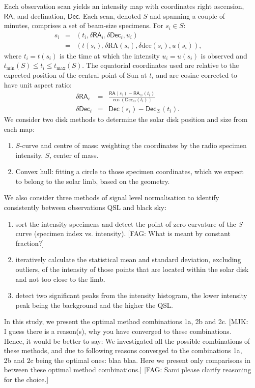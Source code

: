 \documentclass{aa}
\newcommand{\fag}[1]{\textcolor{midpurple}{[FAG: #1]}} %
\newcommand{\mjk}[1]{\textcolor{midgreen}{[MJK: #1]}} %
\newcommand{\eqnl}[2]{\begin{eqnarray}\label{#1}#2\end{eqnarray}}
\newcommand{\s}[2]{{#1}_{\mathrm{#2}}}
\newcommand{\RA}{{\mathsf{RA}}}
\newcommand{\Dec}{{\mathsf{Dec}}}
\newcommand{\dR}{{\mathsf{\delta RA}}}
\newcommand{\dD}{{\mathsf{\delta Dec}}}
\begin{document}
  Each observation scan yields an intensity map with coordinates right 
  ascension, $\RA$, and declination, $\Dec$.
  Each scan, denoted $S$ and spanning a couple of minutes, comprises a set of beam-size specimens. For $s_i \in S$:
  \eqnl{radio_sample}{
  s_i &=& 
  \left( t_i, \dR_i, \dD_i, u_i \right) \\ %
  &=& \left( t(s_i),\delta \mathrm{RA}(s_i), \delta \mathrm{dec}(s_i), u(s_i) \right) \text{,}
  }
  where $t_i=t(s_i)$ is the time at which the intensity $u_i=u(s_i)$ is
  observed and 
  $\s{t}{min}(S) \le t_i \le \s{t}{max}(S)$.
  The equatorial coordinates used are relative to the expected position of
  the central point of Sun at $t_i$ and are cosine corrected to have unit
  aspect ratio:
  \eqnl{relative_radec}{
  \dR_i  &=& \frac{\RA(s_i) - \RA_{\astrosun}(t_i)}{\cos \left( \Dec_{\astrosun}(t_i) \right)} \\
  \dD_i &=& \Dec(s_i) - \Dec_{\astrosun}(t_i)\text{.}
  }
  We consider two disk methods to determine the solar disk position and size
  from each map:
  \begin{enumerate}
    \item $S$-curve and centre of mass: weighting the coordinates by the
    radio specimen intensity, $S$, center of mass.
    \item Convex hull: fitting a circle to those specimen coordinates, which
    we expect to belong to the solar limb, based on the geometry.
  \end{enumerate}
  We also consider three methods of signal level normalisation to identify
  consistently between observations QSL and black sky:
  \begin{enumerate}[a]
    \item  sort the intensity specimens and detect the point of zero curvature
    of the $S$-curve (specimen index vs. intensity).
    \fag{What is meant by constant fraction?}  
    \item iteratively calculate the statistical mean and standard deviation,
    excluding outliers, of the intensity of those points that are located
    within the solar disk and not too close to the limb.
    \item  detect two significant peaks from the intensity histogram,
    the lower intensity peak being the background and the higher the QSL.
  \end{enumerate}
  In this study, we present the optimal method combinations 1a, 2b and 2c.
  \mjk{I guess there is a reason(s), why you have converged to these combinations. Hence, it would be better to say: We investigated all the possible combinations of these methods, and due to following reasons converged to the combinations 1a, 2b and 2c being the optimal ones: blaa blaa. Here we present only comparisons in between these optimal method combinations.}
  \fag{Sami please clarify reasoning for the choice.}
\end{document}

